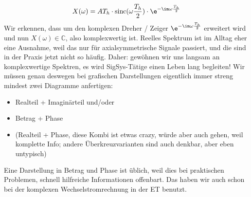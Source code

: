 \begin{Loesung}
\begin{equation}
\label{eq:A8A2DEE53A_Loesung}
X(\omega) = A T_h \cdot \mathrm{sinc}(\omega\frac{T_h}{2}) \cdot  \e^{-\im\omega\frac{T_h}{2}}
\end{equation}
%
Wir erkennen, dass  um den komplexen Dreher / Zeiger $\e^{-\im\omega\frac{T_h}{2}}$
erweitert wird und nun $X(\omega)\in\mathbb{C}$, also komplexwertig ist. Reelles Spektrum ist im Alltag eher eine Ausnahme, weil das nur für axialsymmetrische Signale passiert, und die sind in der Praxis jetzt nicht so häufig. Daher: gewöhnen wir uns langsam an komplexwertige Spektren, es wird SigSys-Tätige einen Leben lang begleiten!
%
Wir müssen genau deswegen bei grafischen Darstellungen eigentlich immer streng mindest
zwei Diagramme anfertigen:
\begin{itemize}
  \item Realteil + Imaginärteil und/oder
  \item Betrag + Phase
  \item (Realteil + Phase, diese Kombi ist etwas crazy, würde aber auch gehen, weil komplette Info; andere Überkreuzvarianten sind auch denkbar, aber eben untypisch)
\end{itemize}
%
Eine Darstellung in Betrag und Phase ist üblich, weil dies bei praktischen
Problemen, schnell hilfreiche Informationen offenbart. Das haben wir auch schon
bei der komplexen Wechselstromrechnung in der ET benutzt.



\end{Loesung}
